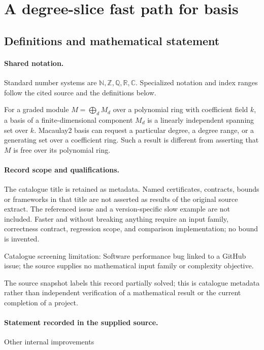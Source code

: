 \documentclass[11pt]{article}
\begin{document}
\section{A degree-slice fast path for basis}\label{statement}

\subsection{Definitions and mathematical statement}

\paragraph{Shared notation.}Standard number systems are $\mathbb N,\mathbb Z,\mathbb Q,\mathbb R,\mathbb C$. Specialized notation and index ranges follow the cited source and the definitions below.


For a graded module $M=\bigoplus_d M_d$ over a polynomial ring with coefficient field $k$, a basis of a finite-dimensional component $M_d$ is a linearly independent spanning set over $k$. Macaulay2 basis can request a particular degree, a degree range, or a generating set over a coefficient ring. Such a result is different from asserting that $M$ is free over its polynomial ring.
\paragraph{Record scope and qualifications.}
The catalogue title is retained as metadata. Named certificates, contracts, bounds or frameworks in that title are not asserted as results of the original source extract.
The referenced issue and a version-specific slow example are not included. Faster and without breaking anything require an input family, correctness contract, regression scope, and comparison implementation; no bound is invented.

Catalogue screening limitation: Software performance bug linked to a GitHub issue; the source supplies no mathematical input family or complexity objective.

The source snapshot labels this record partially solved; this is catalogue metadata rather than independent verification of a mathematical result or the current completion of a project.
\paragraph{Statement recorded in the supplied source.}
Other internal improvements
\end{document}
